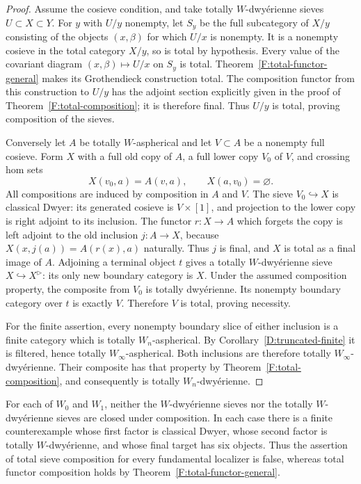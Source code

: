 \begin{proof}
Assume the cosieve condition, and take totally
$W$-dwy\'erienne sieves $U\subset X\subset Y$.
For $y$ with $U/y$ nonempty, let $S_y$ be the
full subcategory of $X/y$ consisting of the
objects $(x,\beta)$ for which $U/x$ is nonempty.
It is a nonempty cosieve in the total category
$X/y$, so is total by hypothesis. Every value
of the covariant diagram $(x,\beta)\mapsto U/x$
on $S_y$ is total. Theorem~\ref{F:total-functor-general}
makes its Grothendieck construction total. The
composition functor from this construction to
$U/y$ has the adjoint section explicitly given
in the proof of Theorem~\ref{F:total-composition};
it is therefore final. Thus $U/y$ is total,
proving composition of the sieves.

Conversely let $A$ be totally $W$-aspherical and
let $V\subset A$ be a nonempty full cosieve.
Form $X$ with a full old copy of $A$, a full
lower copy $V_0$ of $V$, and crossing hom sets
\[
 X(v_0,a)=A(v,a),\qquad X(a,v_0)=\varnothing.
\]
All compositions are induced by composition in
$A$ and $V$. The sieve $V_0\hookrightarrow X$
is classical Dwyer: its generated cosieve is
$V\times[1]$, and projection to the lower
copy is right adjoint to its inclusion.
The functor $r:X\to A$ which forgets the
copy is left adjoint to the old inclusion
$j:A\to X$, because
$X(x,j(a))=A(r(x),a)$ naturally. Thus $j$
is final, and $X$ is total as a final image
of $A$. Adjoining a terminal object $t$ gives
a totally $W$-dwy\'erienne sieve
$X\hookrightarrow X^{\triangleright}$: its
only new boundary category is $X$. Under
the assumed composition property, the
composite from $V_0$ is totally dwy\'erienne.
Its nonempty boundary category over $t$
is exactly $V$. Therefore $V$ is total,
proving necessity.

For the finite assertion, every nonempty boundary
slice of either inclusion is a finite category
which is totally $W_n$-aspherical. By
Corollary~\ref{D:truncated-finite} it is filtered,
hence totally $W_\infty$-aspherical. Both
inclusions are therefore totally
$W_\infty$-dwy\'erienne. Their composite has
that property by Theorem~\ref{F:total-composition},
and consequently is totally $W_n$-dwy\'erienne.
\end{proof}

\begin{theorem}
\label{F:low-sieve-composition}
For each of $W_0$ and $W_1$, neither the
$W$-dwy\'erienne sieves nor the totally
$W$-dwy\'erienne sieves are closed under
composition. In each case there is a finite
counterexample whose first factor is classical
Dwyer, whose second factor is totally
$W$-dwy\'erienne, and whose final target has
six objects. Thus the assertion of total
sieve composition for every fundamental
localizer is false, whereas total functor
composition holds by
Theorem~\ref{F:total-functor-general}.
\end{theorem}

